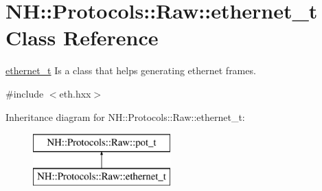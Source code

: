 \hypertarget{class_n_h_1_1_protocols_1_1_raw_1_1ethernet__t}{\section{N\+H\+:\+:Protocols\+:\+:Raw\+:\+:ethernet\+\_\+t Class Reference}
\label{class_n_h_1_1_protocols_1_1_raw_1_1ethernet__t}
}


\hyperlink{class_n_h_1_1_protocols_1_1_raw_1_1ethernet__t}{ethernet\+\_\+t} Is a class that helps generating ethernet frames.  




{\ttfamily \#include $<$eth.\+hxx$>$}

Inheritance diagram for N\+H\+:\+:Protocols\+:\+:Raw\+:\+:ethernet\+\_\+t\+:\begin{figure}[H]
\begin{center}
\leavevmode
\includegraphics[height=2.000000cm]{class_n_h_1_1_protocols_1_1_raw_1_1ethernet__t}
\end{center}
\end{figure}
